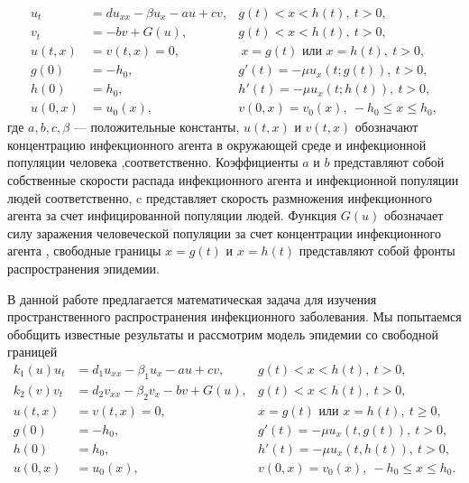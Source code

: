 \begin{align}
\nonumber
u_{t} &= du_{xx} - \beta u_{x} - au + cv,  &  g(t) < x < h(t), \ t > 0,\\
\nonumber
v_{t} &= -bv + G(u),  &      g(t) < x < h(t), \ t > 0,\\
u(t,x) &= v(t,x) = 0, & \ x = g(t) \mbox{ или } x = h(t),  \ t > 0,\\
\nonumber
g(0) &= -h_{0}, & g'(t) = -\mu u_{x}(t; g(t)), \ t > 0,\\
\nonumber
h(0) &= h_{0}, &h'(t) = -\mu u_{x}(t;h(t)), \ t > 0,\\
\nonumber
u(0,x)& = u_{0}(x), &v(0,x) = v_{0}(x), \ -h_{0} \leq x \leq h_{0},
\end{align}
где  $a, b, c , \beta $ —  положительные константы, $u(t,x)$ и $v(t,x)$ обозначают концентрацию инфекционного агента в окружающей среде и инфекционной популяции человека ,соответственно. Коэффициенты $a$ и $b$ представляют собой собственные скорости распада инфекционного агента и инфекционной популяции людей соответственно, c представляет скорость размножения инфекционного агента за счет инфицированной популяции людей. Функция $G(u)$ обозначает силу заражения человеческой популяции за счет концентрации инфекционного агента ,  свободные границы $x = g(t)$ и $x = h(t)$ представляют собой фронты распространения эпидемии.

В данной  работе предлагается математическая задача для изучения пространственного распространения инфекционного заболевания. Мы попытаемся обобщить известные результаты и  рассмотрим  модель эпидемии со свободной границей
\begin{align}
\nonumber
k_{1}(u) u_{t} &= d_{1}u_{xx} - \beta_{1}u_{x} - au + cv, &  g(t) < x < h(t), \ t > 0,\\
\nonumber
k_{2}(v) v_t &= d_2v_{xx}- \beta_{2}v_x - bv + G(u),  &   g(t) < x < h(t), \ t > 0,\\
u(t,x) &= v(t,x) = 0,                                   & x = g(t) \text{ или } x = h(t), \ t \geq 0,\\
\nonumber
g(0) &= -h_{0},                                     &g'(t) = -\mu u_{x}(t, g(t)), \ t > 0,\\
\nonumber
 h(0) &= h_{0},                         & h'(t) = -\mu u_x(t, h(t)) , \ t > 0,\\
\nonumber
u(0,x) &= u_{0}(x),                     & v(0,x) = v_{0}(x), \ -h_{0} \leq x \leq h_{0}.
\end{align}

